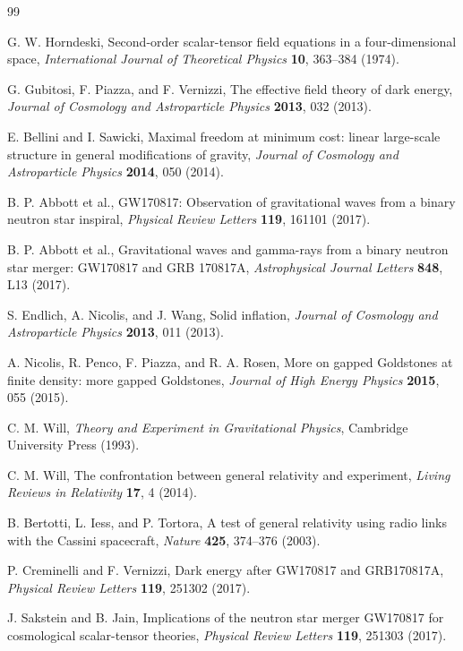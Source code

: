 \documentclass[12pt,a4paper]{article}
\begin{document}
\begin{thebibliography}{99}

G. W. Horndeski, Second-order scalar-tensor field equations in a four-dimensional space, \textit{International Journal of Theoretical Physics} \textbf{10}, 363--384 (1974).

G. Gubitosi, F. Piazza, and F. Vernizzi, The effective field theory of dark energy, \textit{Journal of Cosmology and Astroparticle Physics} \textbf{2013}, 032 (2013).

E. Bellini and I. Sawicki, Maximal freedom at minimum cost: linear large-scale structure in general modifications of gravity, \textit{Journal of Cosmology and Astroparticle Physics} \textbf{2014}, 050 (2014).

B. P. Abbott et al., GW170817: Observation of gravitational waves from a binary neutron star inspiral, \textit{Physical Review Letters} \textbf{119}, 161101 (2017).

B. P. Abbott et al., Gravitational waves and gamma-rays from a binary neutron star merger: GW170817 and GRB 170817A, \textit{Astrophysical Journal Letters} \textbf{848}, L13 (2017).

S. Endlich, A. Nicolis, and J. Wang, Solid inflation, \textit{Journal of Cosmology and Astroparticle Physics} \textbf{2013}, 011 (2013).

A. Nicolis, R. Penco, F. Piazza, and R. A. Rosen, More on gapped Goldstones at finite density: more gapped Goldstones, \textit{Journal of High Energy Physics} \textbf{2015}, 055 (2015).

C. M. Will, \textit{Theory and Experiment in Gravitational Physics}, Cambridge University Press (1993).

C. M. Will, The confrontation between general relativity and experiment, \textit{Living Reviews in Relativity} \textbf{17}, 4 (2014).

B. Bertotti, L. Iess, and P. Tortora, A test of general relativity using radio links with the Cassini spacecraft, \textit{Nature} \textbf{425}, 374--376 (2003).

P. Creminelli and F. Vernizzi, Dark energy after GW170817 and GRB170817A, \textit{Physical Review Letters} \textbf{119}, 251302 (2017).

J. Sakstein and B. Jain, Implications of the neutron star merger GW170817 for cosmological scalar-tensor theories, \textit{Physical Review Letters} \textbf{119}, 251303 (2017).


\end{thebibliography}
\end{document}
